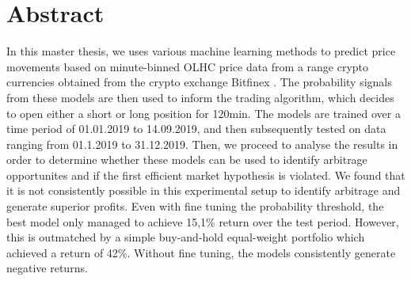 \section*{Abstract}
In this master thesis, we uses various machine learning methods to predict price movements based on minute-binned OLHC price data
from a range crypto currencies obtained from the crypto exchange Bitfinex \cite{bitfinex2012}. 
The probability signals from these models are then used to inform the trading algorithm, 
which decides to open either a short or long position for 120min. The models are trained over a time period of 01.01.2019 to 14.09.2019, 
and then subsequently tested on data ranging from 01.1.2019 to 31.12.2019.
Then, we proceed to analyse the results in order to determine whether these models can be used to identify arbitrage opportunites
and if the first efficient market hypothesis is violated. 
We found that it is not consistently possible in this experimental setup to identify arbitrage and generate superior profits.
Even with fine tuning the probability threshold, the best model only managed to achieve 15,1\% return over the test period.
However, this is outmatched by a simple buy-and-hold equal-weight portfolio which achieved a return of 42\%.
Without fine tuning, the models consistently generate negative returns.
